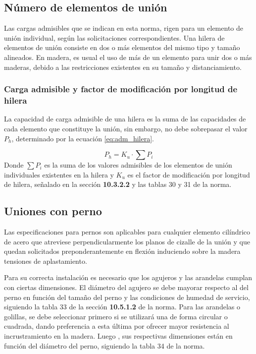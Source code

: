 \subsection{Número de elementos de unión}
Las cargas admisibles que se indican en esta norma, rigen para un elemento de unión individual, según las solicitaciones correspondientes. Una hilera de elementos de unión consiste en dos o más elementos del mismo tipo y tamaño alineados. En madera, es usual el uso de más de un elemento para unir dos o más maderas, debido a las restricciones existentes en su tamaño y distanciamiento.

\subsubsection{Carga admisible y factor de modificación por longitud de hilera}
La capacidad de carga admisible de una hilera es la suma de las capacidades de cada elemento que constituye la unión, sin embargo, no debe sobrepasar el valor $P_h$, determinado por la ecuación \ref{eq:adm_hilera}.

\begin{equation}\label{eq:adm_hilera}
	P_h = K_u \cdot \sum P_i
\end{equation}
Donde $\sum P_i$ es la suma de los valores admisibles de los elementos de unión individuales existentes en la hilera y $K_u$ es el factor de modificación por longitud de hilera, señalado en la sección \textbf{10.3.2.2} y las tablas 30 y 31 de la norma.

\subsection{Uniones con perno}
\label{sec:union_perno}
Las especificaciones para pernos son aplicables para cualquier elemento cilíndrico de acero que atreviese perpendicularmente los planos de cizalle de la unión y que quedan solicitados preponderantemente en flexión induciendo sobre la madera tensiones de aplastamiento.

Para su correcta instalación es necesario que los agujeros y las arandelas cumplan con ciertas dimensiones. El diámetro del agujero se debe mayorar respecto al del perno en función del tamaño del perno y las condiciones de humedad de servicio, siguiendo la tabla 33 de la sección \textbf{10.5.1.2} de la norma. Para las arandelas o golillas, se debe seleccionar primero si se utilizará una de forma circular o cuadrada, dando preferencia a esta última por ofrecer mayor resistencia al incrustramiento en la madera. Luego , sus respectivas dimensiones están en función del diámetro del perno, siguiendo la tabla 34 de la norma.


